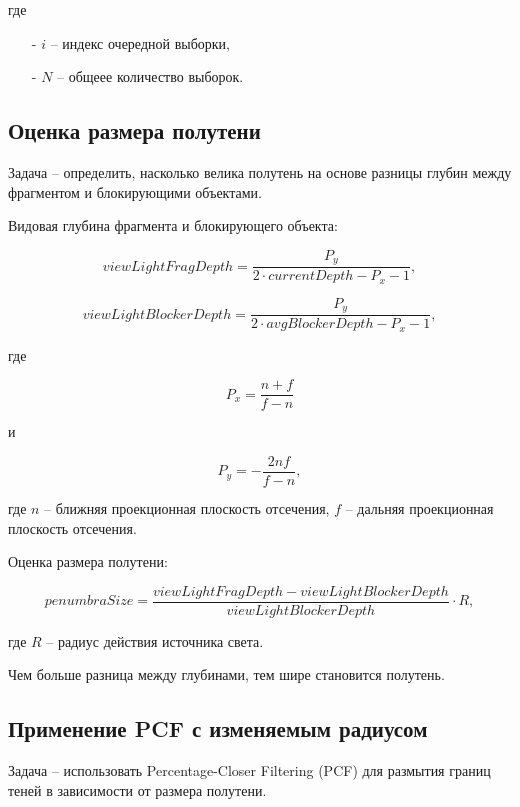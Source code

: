 \noindent где

\begin{itemize}
    \item[-] $i$ -- индекс очередной выборки,
    \item[-] $N$ -- общеее количество выборок.
\end{itemize}

\subsection*{Оценка размера полутени}

Задача -- определить, насколько велика полутень на основе разницы
глубин между фрагментом и блокирующими объектами.

Видовая глубина фрагмента и блокирующего объекта:

\begin{equation}
    \label{equ:view_depth_object}
    viewLightFragDepth = \frac{P_y}{2 \cdot currentDepth - P_x - 1},
\end{equation}

\begin{equation}
    \label{equ:view_depth_blocker}
    viewLightBlockerDepth = \frac{P_y}{2 \cdot avgBlockerDepth - P_x - 1},
\end{equation}

\noindent где

\[P_x = \frac{n + f}{f - n}\]

\noindent и

\[P_y = -\frac{2 n f}{f - n},\]

\noindent где $n$ -- ближняя проекционная плоскость отсечения,
$f$ -- дальняя проекционная плоскость отсечения.

Оценка размера полутени:

\begin{equation}
    \label{equ:penumbra}
    penumbraSize = \frac{viewLightFragDepth - viewLightBlockerDepth}{viewLightBlockerDepth} \cdot R,
\end{equation}

\noindent где $R$ -- радиус действия источника света.

Чем больше разница между глубинами, тем шире становится полутень.

\subsection*{Применение PCF с изменяемым радиусом}

Задача -- использовать Percentage-Closer Filtering (PCF) для размытия границ теней
в зависимости от размера полутени.

